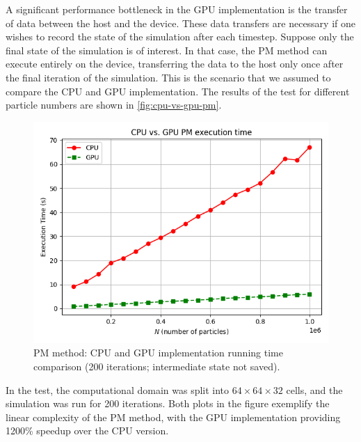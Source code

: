 A significant performance bottleneck in the GPU implementation is the transfer of data between the host and the device.
These data transfers are necessary if one wishes to record the state of the simulation after each timestep.
Suppose only the final state of the simulation is of interest. In that case, the PM method can execute entirely on the device, transferring the data to the host only once after the final iteration of the simulation.
This is the scenario that we assumed to compare the CPU and GPU implementation.
The results of the test for different particle numbers are shown in \autoref{fig:cpu-vs-gpu-pm}.
\begin{figure}[htp]
    \centering
    \includegraphics[scale=0.6]{chapters/pm-method/img/cpu-vs-gpu.png}
    \caption{PM method: CPU and GPU implementation running time comparison (200 iterations; intermediate state not saved).}
    \label{fig:cpu-vs-gpu-pm}
\end{figure}
In the test, the computational domain was split into $64\times 64 \times 32$ cells, and the simulation was run for 200 iterations.
Both plots in the figure exemplify the linear complexity of the PM method, with the GPU implementation providing 1200\% speedup over the CPU version.